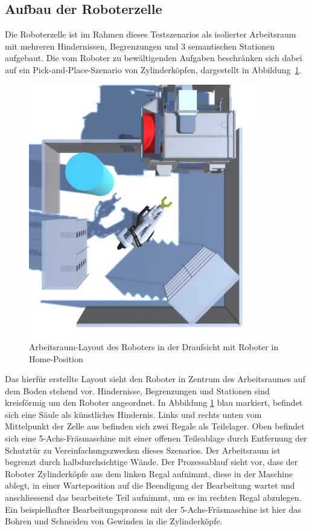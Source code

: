 \subsection{Aufbau der Roboterzelle}
\label{sec:aufbauTestszenario}

Die Roboterzelle ist im Rahmen dieses Testszenarios als isolierter Arbeitsraum
mit mehreren Hindernissen, Begrenzungen und 3 semantischen Stationen aufgebaut.
Die vom Roboter zu bewältigenden Aufgaben beschränken sich dabei auf ein
Pick-and-Place-Szenario von Zylinderköpfen, dargestellt in
Abbildung~\ref{figure:arbeitsraum}.

\begin{figure}[H]
  \centering
  \includegraphics[width=10cm]{Figures/Roboterzelle.png}
  \caption{Arbeitsraum-Layout des Roboters in der Draufsicht mit Roboter in
  Home-Position}
  \label{figure:arbeitsraum}
\end{figure}

Das hierfür erstellte Layout sieht den Roboter in Zentrum des Arbeitsraumes auf
dem Boden stehend vor. Hindernisse, Begrenzungen und Stationen sind kreisförmig
um den Roboter angeordnet. In Abbildung
\ref{figure:arbeitsraum}
blau markiert, befindet sich eine Säule als künstliches Hindernis.
Links und rechts unten vom Mittelpunkt der Zelle aus befinden sich
zwei Regale als Teilelager. Oben befindet sich eine 5-Achs-Fräsmaschine mit
einer offenen Teileablage durch Entfernung der Schutztür zu
Vereinfachungszwecken dieses Szenarios. Der Arbeitsraum ist begrenzt durch
halbdurchsichtige Wände. Der Prozessablauf sieht vor, dass der Roboter
Zylinderköpfe aus dem linken Regal aufnimmt, diese in der Maschine ablegt, in
einer Warteposition auf die Beendigung der Bearbeitung wartet und anschliessend
das bearbeitete Teil aufnimmt, um es im rechten Regal abzulegen. Ein
beispielhafter Bearbeitungsprozess mit der 5-Achs-Fräsmaschine ist
hier das Bohren und Schneiden von Gewinden
in die Zylinderköpfe.

